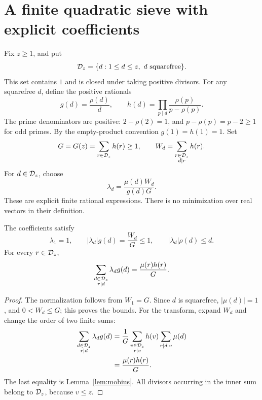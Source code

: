 \section{A finite quadratic sieve with explicit coefficients}
\label{sec:sieve}

Fix \(z\ge1\), and put
\[
 \mathcal D_z=\{d:1\le d\le z,\ d\text{ squarefree}\}.
\]
This set contains \(1\) and is closed under taking positive divisors.
For any squarefree \(d\), define the positive rationals
\begin{equation}
 g(d)=\frac{\rho(d)}d,\qquad
 h(d)=\prod_{p\mid d}\frac{\rho(p)}{p-\rho(p)}.
 \label{eq:gh}
\end{equation}
The prime denominators are positive: \(2-\rho(2)=1\), and
\(p-\rho(p)=p-2\ge1\) for odd primes.
By the empty-product convention \(g(1)=h(1)=1\).
Set
\[
 G=G(z)=\sum_{r\in\mathcal D_z}h(r)\ge1,\qquad
 W_d=\sum_{\substack{r\in\mathcal D_z\\d\mid r}}h(r).
\]
For \(d\in\mathcal D_z\), choose
\begin{equation}
 \boxed{\qquad
 \lambda_d=\frac{\mu(d)W_d}{g(d)G}.
 \qquad}
 \label{eq:weights}
\end{equation}
These are explicit finite rational expressions. There is no minimization
over real vectors in their definition.

\begin{lemma}
\label{lem:weights}
The coefficients satisfy
\begin{equation}
 \lambda_1=1,\qquad
 |\lambda_d|g(d)=\frac{W_d}G\le1,\qquad
 |\lambda_d|\rho(d)\le d.
 \label{eq:coefficient-bound}
\end{equation}
For every \(r\in\mathcal D_z\),
\begin{equation}
 \sum_{\substack{d\in\mathcal D_z\\r\mid d}}\lambda_dg(d)
   =\frac{\mu(r)h(r)}G.
 \label{eq:transform}
\end{equation}
\end{lemma}

\begin{proof}
The normalization follows from \(W_1=G\).
Since \(d\) is squarefree, \(|\mu(d)|=1\), and \(0<W_d\le G\);
this proves the bounds. For the transform, expand \(W_d\) and change the
order of two finite sums:
\begin{align*}
 \sum_{\substack{d\in\mathcal D_z\\r\mid d}}\lambda_dg(d)
 &=\frac1G
   \sum_{\substack{v\in\mathcal D_z\\r\mid v}}
          h(v)\sum_{r\mid d\mid v}\mu(d)\\
 &=\frac{\mu(r)h(r)}G.
\end{align*}
The last equality is Lemma~\ref{lem:mobius}. All divisors occurring in the
inner sum belong to \(\mathcal D_z\), because \(v\le z\).
\end{proof}

